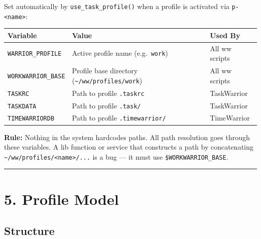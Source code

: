 \documentclass[
]{article}
\newcounter{none} %
\begin{document}
Set automatically by \texttt{use\_task\_profile()} when a profile is
activated via \texttt{p-\textless{}name\textgreater{}}:

{\def\LTcaptype{none} %
\begin{longtable}[]{@{}
  >{\raggedright\arraybackslash}p{}
  >{\raggedright\arraybackslash}p{}
  >{\raggedright\arraybackslash}p{}@{}}
\toprule\noalign{}
\begin{minipage}[b]{\linewidth}\raggedright
Variable
\end{minipage} & \begin{minipage}[b]{\linewidth}\raggedright
Value
\end{minipage} & \begin{minipage}[b]{\linewidth}\raggedright
Used By
\end{minipage} \\
\midrule\noalign{}
\endhead
\bottomrule\noalign{}
\endlastfoot
\texttt{WARRIOR\_PROFILE} & Active profile name (e.g.~\texttt{work}) &
All ww scripts \\
\texttt{WORKWARRIOR\_BASE} & Profile base directory
(\texttt{\textasciitilde{}/ww/profiles/work}) & All ww scripts \\
\texttt{TASKRC} & Path to profile \texttt{.taskrc} & TaskWarrior \\
\texttt{TASKDATA} & Path to profile \texttt{.task/} & TaskWarrior \\
\texttt{TIMEWARRIORDB} & Path to profile \texttt{.timewarrior/} &
TimeWarrior \\
\end{longtable}
}

\textbf{Rule:} Nothing in the system hardcodes paths. All path
resolution goes through these variables. A lib function or service that
constructs a path by concatenating
\texttt{\textasciitilde{}/ww/profiles/\textless{}name\textgreater{}/...}
is a bug --- it must use \texttt{\$WORKWARRIOR\_BASE}.

\begin{center}\rule{0.5\linewidth}{0.5pt}\end{center}

\section{5. Profile Model}\label{profile-model}

\subsection{Structure}\label{structure}
\end{document}
